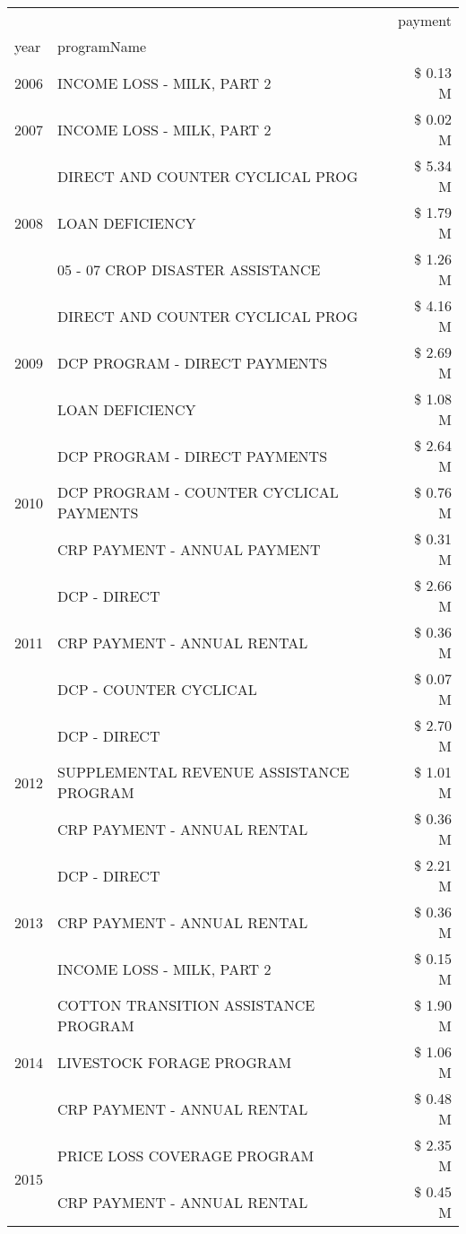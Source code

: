 \begin{tabular}{llr}
\toprule
 &  & payment \\
year & programName &  \\
\midrule
2006 & INCOME LOSS - MILK, PART 2 & \$ 0.13 M \\
\cline{1-3}
2007 & INCOME LOSS - MILK, PART 2 & \$ 0.02 M \\
\cline{1-3}
\multirow[t]{3}{*}{2008} & DIRECT AND COUNTER CYCLICAL PROG & \$ 5.34 M \\
 & LOAN DEFICIENCY & \$ 1.79 M \\
 & 05 - 07 CROP DISASTER ASSISTANCE & \$ 1.26 M \\
\cline{1-3}
\multirow[t]{3}{*}{2009} & DIRECT AND COUNTER CYCLICAL PROG & \$ 4.16 M \\
 & DCP PROGRAM - DIRECT PAYMENTS & \$ 2.69 M \\
 & LOAN DEFICIENCY & \$ 1.08 M \\
\cline{1-3}
\multirow[t]{3}{*}{2010} & DCP PROGRAM - DIRECT PAYMENTS & \$ 2.64 M \\
 & DCP PROGRAM - COUNTER CYCLICAL PAYMENTS & \$ 0.76 M \\
 & CRP PAYMENT - ANNUAL PAYMENT & \$ 0.31 M \\
\cline{1-3}
\multirow[t]{3}{*}{2011} & DCP - DIRECT & \$ 2.66 M \\
 & CRP PAYMENT - ANNUAL RENTAL & \$ 0.36 M \\
 & DCP - COUNTER CYCLICAL & \$ 0.07 M \\
\cline{1-3}
\multirow[t]{3}{*}{2012} & DCP - DIRECT & \$ 2.70 M \\
 & SUPPLEMENTAL REVENUE ASSISTANCE PROGRAM & \$ 1.01 M \\
 & CRP PAYMENT - ANNUAL RENTAL & \$ 0.36 M \\
\cline{1-3}
\multirow[t]{3}{*}{2013} & DCP - DIRECT & \$ 2.21 M \\
 & CRP PAYMENT - ANNUAL RENTAL & \$ 0.36 M \\
 & INCOME LOSS - MILK, PART 2 & \$ 0.15 M \\
\cline{1-3}
\multirow[t]{3}{*}{2014} & COTTON TRANSITION ASSISTANCE PROGRAM & \$ 1.90 M \\
 & LIVESTOCK FORAGE PROGRAM & \$ 1.06 M \\
 & CRP PAYMENT - ANNUAL RENTAL & \$ 0.48 M \\
\cline{1-3}
\multirow[t]{3}{*}{2015} & PRICE LOSS COVERAGE PROGRAM & \$ 2.35 M \\
 & CRP PAYMENT - ANNUAL RENTAL & \$ 0.45 M \\

\end{tabular}
